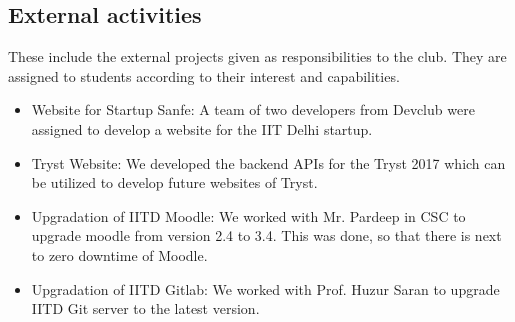 \documentclass[11pt,a4paper]{article}
\begin{document}
    \subsection{External activities}
    These include the external projects given as responsibilities to the club. They are assigned to students according to their interest and capabilities.
    \begin{itemize}
        \item Website for Startup Sanfe: A team of two developers from Devclub were assigned to develop a website for the IIT Delhi startup.
        \item Tryst Website: We developed the backend APIs for the Tryst 2017 which can be utilized to develop future websites of Tryst. 
        \item Upgradation of IITD Moodle: We worked with Mr. Pardeep in CSC to upgrade moodle from version 2.4 to 3.4. This was done, so that there is next to zero downtime of Moodle.
        \item Upgradation of IITD Gitlab: We worked with Prof. Huzur Saran to upgrade IITD Git server to the latest version. 
    \end{itemize}
    
\end{document}
